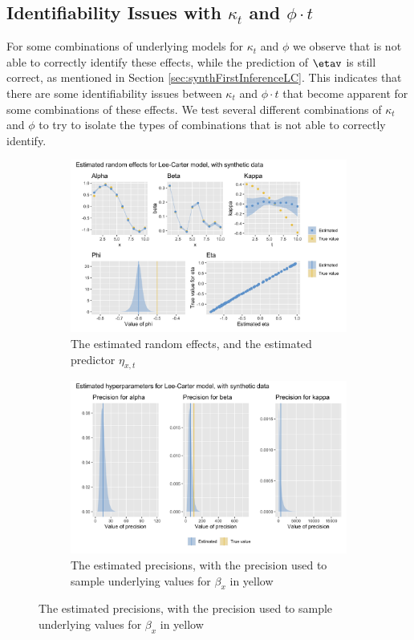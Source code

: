 \subsection{Identifiability Issues with $\kappa_t$ and $\phi\cdot t$}
\label{sec:IdentifiabilityKappa}
For some combinations of underlying models for $\kappa_t$ and $\phi$ we observe that \inlabru is not able to correctly identify these effects, while the prediction of $\etav$ is still correct, as mentioned in Section \ref{sec:synthFirstInferenceLC}. This indicates that there are some identifiability issues between $\kappa_t$ and $\phi \cdot t$ that become apparent for some combinations of these effects. We test several different combinations of $\kappa_t$ and $\phi$ to try to isolate the types of combinations that \inlabru is not able to correctly identify.
\begin{figure}[h!]
    \centering
    \begin{subfigure}[b]{0.85\textwidth}
        \includegraphics[width=\textwidth]{synthetic-data/Figures/effects-LC-synthetic-identifiability.png}
        \caption{The estimated random effects, and the estimated predictor $\eta_{x,t}$}
        \label{fig:unidentifiabilityKappa-top}
    \end{subfigure}
    
    \begin{subfigure}[b]{0.6\textwidth}
        \includegraphics[width=\textwidth]{synthetic-data/Figures/hyperparameters-LC-synthetic-2-2.png}
        \caption{The estimated precisions, with the precision used to sample underlying values for $\beta_x$ in yellow}
        \label{fig:unidentifiabilityKappa-top}
    \end{subfigure}
    

\end{figure}
